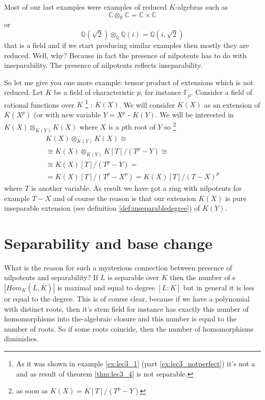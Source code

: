 Most of our last examples were examples of reduced $K$-algebras such
as
\[
\mathbb{C} \otimes_{\mathbb{R}} \mathbb{C} =
\mathbb{C} \times \mathbb{C}
\]
or
\[
\mathbb{Q}\left(\sqrt{2}\right) \otimes_{\mathbb{Q}}
\mathbb{Q}\left(i\right) =
\mathbb{Q}\left(i, \sqrt{2}\right)
\]
that is a field and if we start producing similar examples then mostly
they are reduced. Well, why? Because in fact the presence of
nilpotents has to do with inseparability. The presence of nilpotents
reflects inseparability.

So let me give you one more example: tensor product of
extensions which is not reduced. Let $K$ be a field of characteristic
$p$, for instance $\mathbb{F}_p$. Consider a field of rational
functions over $K$
\footnote{
  As it was shown in example \ref{ex:lec3_1} (part
  \ref{ex:lec3_notperfect}) it's not a   and
  as result of theorem \ref{thm:lec3_4} is not separable.
}
: $K\left(X\right)$. We will consider
$K\left(X\right)$ as an extension of $K\left(X^p\right)$ (or with new
variable $Y = X^p$ - $K\left(Y\right)$. We will be interested in
\(
K\left(X\right)
\otimes_{K\left(Y\right)}
K\left(X\right)
\) where $X$ is a $p$th root of $Y$ so
\footnote{
  as soon as
  $K\left(X\right) = K\left[T\right]/\left(T^p - Y\right)$
}
\begin{eqnarray}
K\left(X\right)
\otimes_{K\left(Y\right)}
K\left(X\right)
\cong
\nonumber \\
\cong
K\left(X\right)
\otimes_{K\left(Y\right)}
K\left[T\right]/\left(T^p - Y\right)
\cong
\nonumber \\
\cong
K\left(X\right)\left[T\right]/\left(T^p - Y\right) =
\nonumber \\
=
K\left(X\right)\left[T\right]/\left(T^p - X^p\right) =
K\left(X\right)\left[T\right]/\left(T - X\right)^p
\nonumber
\end{eqnarray}
where $T$ is another variable. As result we have got a ring with
nilpotents for example $T - X$ and of course the reason is that our
extension $K\left(X\right)$ is pure inseparable extension (see
definition \ref{def:inseparabledegree}) of $K\left(Y\right)$.  

\section{Separability and base change}
What is the reason for such a mysterious connection between 
presence of nilpotents and separability? If $L$ is separable over $K$
then the number of s
$\left|Hom_K\left(L, \bar{K}\right)\right|$ is maximal and equal to
degree $\left[L : K\right]$ but in general it is less or equal to the
degree.  This is of course clear, because  if we have a polynomial
with distinct roots, then it's stem field for instance  has exactly
this number of  homomorphisms into the-algebraic closure and this
number is equal to the number of roots. So if some roots coincide,  
then the number of homomorphisms diminishes. 


